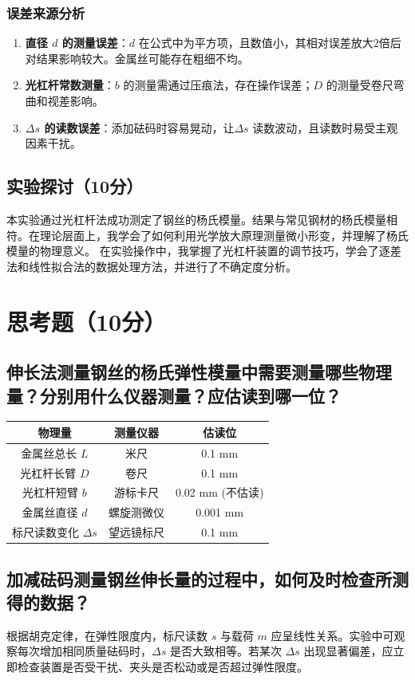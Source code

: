 \documentclass[]{../template/Report}%
\begin{document}
\begin{fullreportonly}
\subsubsection{误差来源分析}
\begin{enumerate}
    \item \textbf{直径 $d$ 的测量误差}：$d$ 在公式中为平方项，且数值小，其相对误差放大2倍后对结果影响较大。金属丝可能存在粗细不均。
    \item \textbf{光杠杆常数测量}：$b$ 的测量需通过压痕法，存在操作误差；$D$ 的测量受卷尺弯曲和视差影响。
    \item \textbf{$\Delta s$ 的读数误差}：添加砝码时容易晃动，让$\Delta s$ 读数波动，且读数时易受主观因素干扰。
\end{enumerate}

\subsection{实验探讨（10分）}
本实验通过光杠杆法成功测定了钢丝的杨氏模量。结果与常见钢材的杨氏模量相符。在理论层面上，我学会了如何利用光学放大原理测量微小形变，并理解了杨氏模量的物理意义。
在实验操作中，我掌握了光杠杆装置的调节技巧，学会了逐差法和线性拟合法的数据处理方法，并进行了不确定度分析。

\section{思考题（10分）}
\subsection{伸长法测量钢丝的杨氏弹性模量中需要测量哪些物理量？分别用什么仪器测量？应估读到哪一位？}
\begin{table}[H]
	\centering
	\begin{tabular}{ccc}
		\toprule
		物理量 & 测量仪器 & 估读位 \\
		\midrule
		金属丝总长 $L$ & 米尺 & 0.1 mm \\
		光杠杆长臂 $D$ & 卷尺 & 0.1 mm \\
		光杠杆短臂 $b$ & 游标卡尺 & 0.02 mm (不估读) \\
		金属丝直径 $d$ & 螺旋测微仪 & 0.001 mm \\
		标尺读数变化 $\Delta s$ & 望远镜标尺 & 0.1 mm \\
		\bottomrule
	\end{tabular}
\end{table}

\subsection{加减砝码测量钢丝伸长量的过程中，如何及时检查所测得的数据？}
根据胡克定律，在弹性限度内，标尺读数 $s$ 与载荷 $m$ 应呈线性关系。实验中可观察每次增加相同质量砝码时，$\Delta s$ 是否大致相等。若某次 $\Delta s$ 出现显著偏差，应立即检查装置是否受干扰、夹头是否松动或是否超过弹性限度。


\end{fullreportonly}
\end{document}
